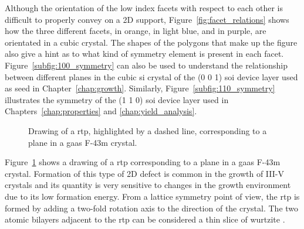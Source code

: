 Although the orientation of the low index facets with respect to each other is difficult to properly convey on a 2D support, Figure~\ref{fig:facet_relations} shows how the three different facets,  in orange,  in light blue, and  in purple, are orientated in a cubic crystal. The shapes of the polygons that make up the figure also give a hint as to what kind of symmetry element is present in each facet. Figure~\ref{subfig:100_symmetry} can also be used to understand the relationship between different planes in the cubic \acl{si} crystal of the \hkl(0 0 1) \acf{soi} device layer used as seed in Chapter~\ref{chap:growth}. Similarly, Figure~\ref{subfig:110_symmetry} illustrates the symmetry of the \hkl(1 1 0) \acs{soi} device layer used in Chapters~\ref{chap:properties} and \ref{chap:yield_analysis}.

\begin{figure}
    \centering
    \caption[Drawing of a  \acl{rtp} in a F-43m crystal.]{Drawing of a \acl{rtp}, highlighted by a dashed line, corresponding to a  plane in a \acs{gaas} F-43m crystal.}
    \label{fig:GaAs_rtp}
\end{figure}

Figure~\ref{fig:GaAs_rtp} shows a drawing of a \acf{rtp} corresponding to a  plane in a \acs{gaas} F-43m crystal. Formation of this type of 2D defect is common in the growth of III-V crystals \cite{Borg2017} and its quantity is very sensitive to changes in the growth environment \cite{Algra2008, Chi2013} due to its low formation energy. From a lattice symmetry point of view, the \acs{rtp} is formed by adding a two-fold rotation axis to the  direction of the crystal. The two atomic bilayers adjacent to the \acs{rtp} can be considered a thin slice of wurtzite \cite{Glas2007, Vedel2022}.

